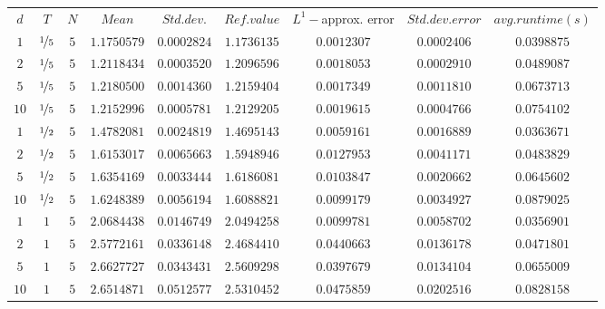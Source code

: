 \begin{tabular}{ccccccccc}
$d$ & $T$ & $N$ & $Mean$ & $Std. dev.$ & $Ref. value$ & $L^1-$approx. error & $Std. dev. error$ & $avg. runtime (s)$\\
$1$ & $\nicefrac{1}{5}$ & $5$ & $1.1750579$ & $0.0002824$ & $1.1736135$ & $0.0012307$ & $0.0002406$ & $0.0398875$\\
$2$ & $\nicefrac{1}{5}$ & $5$ & $1.2118434$ & $0.0003520$ & $1.2096596$ & $0.0018053$ & $0.0002910$ & $0.0489087$\\
$5$ & $\nicefrac{1}{5}$ & $5$ & $1.2180500$ & $0.0014360$ & $1.2159404$ & $0.0017349$ & $0.0011810$ & $0.0673713$\\
$10$ & $\nicefrac{1}{5}$ & $5$ & $1.2152996$ & $0.0005781$ & $1.2129205$ & $0.0019615$ & $0.0004766$ & $0.0754102$\\
$1$ & $\nicefrac{1}{2}$ & $5$ & $1.4782081$ & $0.0024819$ & $1.4695143$ & $0.0059161$ & $0.0016889$ & $0.0363671$\\
$2$ & $\nicefrac{1}{2}$ & $5$ & $1.6153017$ & $0.0065663$ & $1.5948946$ & $0.0127953$ & $0.0041171$ & $0.0483829$\\
$5$ & $\nicefrac{1}{2}$ & $5$ & $1.6354169$ & $0.0033444$ & $1.6186081$ & $0.0103847$ & $0.0020662$ & $0.0645602$\\
$10$ & $\nicefrac{1}{2}$ & $5$ & $1.6248389$ & $0.0056194$ & $1.6088821$ & $0.0099179$ & $0.0034927$ & $0.0879025$\\
$1$ & $1$ & $5$ & $2.0684438$ & $0.0146749$ & $2.0494258$ & $0.0099781$ & $0.0058702$ & $0.0356901$\\
$2$ & $1$ & $5$ & $2.5772161$ & $0.0336148$ & $2.4684410$ & $0.0440663$ & $0.0136178$ & $0.0471801$\\
$5$ & $1$ & $5$ & $2.6627727$ & $0.0343431$ & $2.5609298$ & $0.0397679$ & $0.0134104$ & $0.0655009$\\
$10$ & $1$ & $5$ & $2.6514871$ & $0.0512577$ & $2.5310452$ & $0.0475859$ & $0.0202516$ & $0.0828158$\\
\end{tabular}
